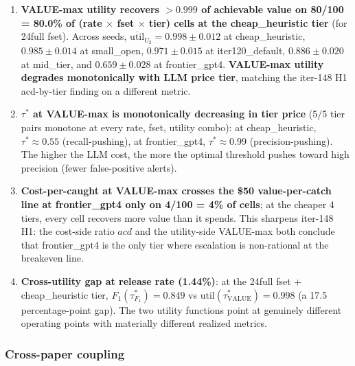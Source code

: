 \documentclass{article}
\begin{document}
\begin{enumerate}
\item \textbf{VALUE-max utility recovers $>0.999$ of achievable
value on 80/100 = 80.0\% of (rate $\times$ fset $\times$ tier) cells at
the cheap\_heuristic tier} (for 24full fset). Across seeds,
$\overline{\mathrm{util}}_{U_2} = 0.998 \pm 0.012$ at cheap\_heuristic,
$0.985 \pm 0.014$ at small\_open, $0.971 \pm 0.015$ at iter120\_default,
$0.886 \pm 0.020$ at mid\_tier, and $0.659 \pm 0.028$ at frontier\_gpt4.
\textbf{VALUE-max utility degrades monotonically with LLM price tier},
matching the iter-148 H1 acd-by-tier finding on a different metric.

\item \textbf{$\tau^*$ at VALUE-max is monotonically decreasing in tier
price} (5/5 tier pairs monotone at every rate, fset, utility combo):
at cheap\_heuristic, $\tau^* \approx 0.55$ (recall-pushing), at
frontier\_gpt4, $\tau^* \approx 0.99$ (precision-pushing). The
higher the LLM cost, the more the optimal threshold pushes toward
high precision (fewer false-positive alerts).

\item \textbf{Cost-per-caught at VALUE-max crosses the \$50
value-per-catch line at frontier\_gpt4 only on 4/100 = 4\% of cells};
at the cheaper 4 tiers, every cell recovers more value than it spends.
This sharpens iter-148 H1: the cost-side ratio $acd$ and the
utility-side VALUE-max both conclude that frontier\_gpt4 is the only tier
where escalation is non-rational at the breakeven line.

\item \textbf{Cross-utility gap at release rate (1.44\%)}: at the
24full fset + cheap\_heuristic tier, $F_1(\tau^*_{F_1}) = 0.849$ vs
$\mathrm{util}(\tau^*_{\mathrm{VALUE}}) = 0.998$ (a 17.5 percentage-point
gap). The two utility functions point at genuinely different
operating points with materially different realized metrics.
\end{enumerate}

\subsubsection{Cross-paper coupling}
\end{document}

